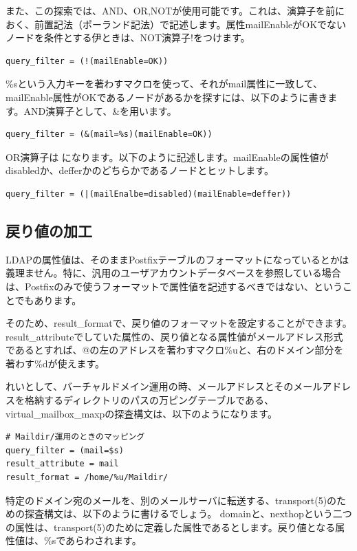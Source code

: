 また、この探索では、AND、OR,NOTが使用可能です。これは、演算子を前におく、前置記法（ポーランド記法）で記述します。属性mailEnableがOKでないノードを条件とする伊ときは、NOT演算子!をつけます。

\begin{verbatim}
query_filter = (!(mailEnable=OK))
\end{verbatim}

\%sという入力キーを著わすマクロを使って、それがmail属性に一致して、mailEnable属性がOKであるノードがあるかを探すには、以下のように書きます。AND演算子として、\&を用います。

\begin{verbatim}
query_filter = (&(mail=%s)(mailEnable=OK))
\end{verbatim}

OR演算子は
\textbar
になります。以下のように記述します。mailEnableの属性値がdisabledか、defferかのどちらかであるノードとヒットします。

\begin{verbatim}
query_filter = (|(mailEnalbe=disabled)(mailEnable=deffer))
\end{verbatim}



\subsection{戻り値の加工}

LDAPの属性値は、そのままPostfixテーブルのフォーマットになっているとかは義理ません。特に、汎用のユーザアカウントデータベースを参照している場合は、Postfixのみで使うフォーマットで属性値を記述するべきではない、ということでもあります。

そのため、result\_formatで、戻り値のフォーマットを設定することができます。result\_attributeでしていた属性の、戻り値となる属性値がメールアドレス形式であるとすれば、@の左のアドレスを著わすマクロ\%uと、右のドメイン部分を著わす\%dが使えます。

れいとして、バーチャルドメイン運用の時、メールアドレスとそのメールアドレスを格納するディレクトリのパスの万ピングテーブルである、virtual\_mailbox\_maxpの探査構文は、以下のようになります。

\begin{verbatim}
# Maildir/運用のときのマッピング
query_filter = (mail=$s)
result_attribute = mail
result_format = /home/%u/Maildir/
\end{verbatim}

特定のドメイン宛のメールを、別のメールサーバに転送する、transport(5)のための探査構文は、以下のように書けるでしょう。
domainと、nexthopという二つの属性は、transport(5)のために定義した属性であるとします。戻り値となる属性値は、\%sであらわされます。

